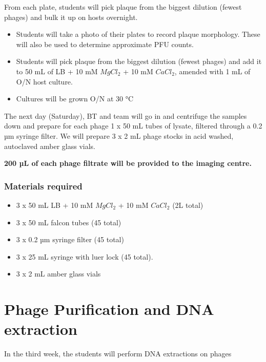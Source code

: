 \documentclass[
]{book}
\providecommand{\tightlist}{%
  \setlength{\itemsep}{0pt}\setlength{\parskip}{0pt}}
\begin{document}
From each plate, students will pick plaque from the biggest dilution (fewest phages) and bulk it up on hosts overnight.

\begin{itemize}
\tightlist
\item
  Students will take a photo of their plates to record plaque morphology. These will also be used to determine approximate PFU counts.
\item
  Students will pick plaque from the biggest dilution (fewest phages) and add it to 50 mL of LB + 10 mM \(MgCl_{2}\) + 10 mM \(CaCl_{2}\), amended with 1 mL of O/N host culture.
\item
  Cultures will be grown O/N at 30 °C
\end{itemize}

The next day (Saturday), BT and team will go in and centrifuge the samples down and prepare for each phage 1 x 50 mL tubes of lysate, filtered through a 0.2 µm syringe filter. We will prepare 3 x 2 mL phage stocks in acid washed, autoclaved amber glass vials.

\textbf{200 µL of each phage filtrate will be provided to the imaging centre.}

\hypertarget{materials-required-9}{%
\subsection{Materials required}\label{materials-required-9}}

\begin{itemize}
\tightlist
\item
  3 x 50 mL LB + 10 mM \(MgCl_{2}\) + 10 mM \(CaCl_{2}\) (2L total)
\item
  3 x 50 mL falcon tubes (45 total)
\item
  3 x 0.2 µm syringe filter (45 total)
\item
  3 x 25 mL syringe with luer lock (45 total).
\item
  3 x 2 mL amber glass vials
\end{itemize}

\hypertarget{phage-purification-and-dna-extraction}{%
\chapter{Phage Purification and DNA extraction}\label{phage-purification-and-dna-extraction}}

In the third week, the students will perform DNA extractions on phages
\end{document}
